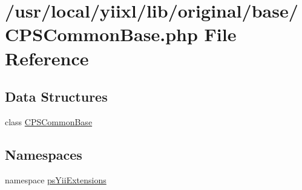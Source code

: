 \hypertarget{CPSCommonBase_8php}{
\section{/usr/local/yiixl/lib/original/base/CPSCommonBase.php File Reference}
\label{CPSCommonBase_8php}
}
\subsection*{Data Structures}
\begin{DoxyCompactItemize}
\item 
class \hyperlink{classCPSCommonBase}{CPSCommonBase}
\end{DoxyCompactItemize}
\subsection*{Namespaces}
\begin{DoxyCompactItemize}
\item 
namespace \hyperlink{namespacepsYiiExtensions}{psYiiExtensions}
\end{DoxyCompactItemize}
